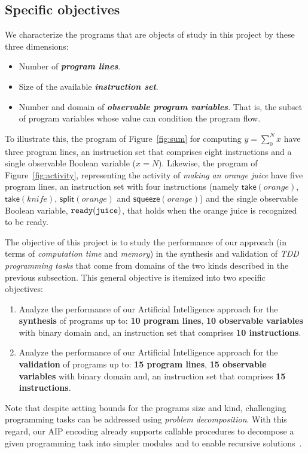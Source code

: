 \documentclass[10pt,a4paper]{paper}
\begin{document}
\subsection{Specific objectives}
\label{sec:objectivos}
We characterize the programs that are objects of study in this project by these three dimensions:
\begin{itemize}
\item Number of {\bf\em program lines}.
\item Size of the available {\bf\em instruction set}.
\item Number and domain of {\bf\em observable program variables}. That is, the subset of program variables whose value can condition the program flow.
\end{itemize}  

To illustrate this, the program of Figure~\ref{fig:sum} for computing $y = \sum_0^N x$ have three program lines, an instruction set that comprises eight instructions and a single observable Boolean variable ($x=N$). Likewise, the program of Figure~\ref{fig:activity}, representing the activity of {\em making an orange juice} have five program lines, an instruction set with four instructions (namely $\mathsf{take}(orange)$, $\mathsf{take}(knife)$, $\mathsf{split}(orange)$ and $\mathsf{squeeze}(orange)$) and the single observable Boolean variable, ${\tt ready(juice)}$, that holds when the orange juice is recognized to be ready.

The objective of this project is to study the performance of our approach (in terms of  {\em computation time} and {\em memory}) in the synthesis and validation of {\em TDD programming tasks} that come from domains of the two kinds described in the previous subsection. This general objective is itemized into two specific objectives:
\begin{enumerate}
\item Analyze the performance of our Artificial Intelligence approach for the {\bf synthesis} of programs up to: {\bf 10 program lines}, {\bf 10 observable variables} with binary domain and, an instruction set that comprises {\bf 10 instructions}. 
\item Analyze the performance of our Artificial Intelligence approach for the {\bf validation} of programs up to: {\bf 15 program lines}, {\bf 15 observable variables} with binary domain and, an instruction set that comprises {\bf 15 instructions}. 
\end{enumerate}

Note that despite setting bounds for the programs size and kind, challenging programming tasks can be addressed using {\em problem decomposition}. With this regard, our AIP encoding already supports callable procedures to decompose a given programming task into simpler modules and to enable recursive solutions~\cite{sergio:aprograming:icaps16,sergio:aprograming:ijcai16,jimenez2018review,segovia:FSC:JAIR2018,segovia:programs:AIJ19}.
\end{document}
